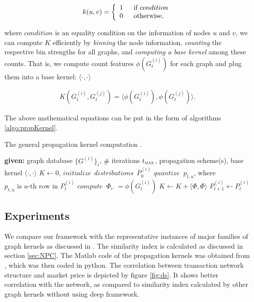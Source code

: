 \documentclass[12pt,a4paper]{article}
\numberwithin{equation}{section}
\numberwithin{figure}{section}
\numberwithin{table}{section}
\begin{document}
\begin{align}
  k(u,v) = \left\{
  \begin{array}{l l}
    1\;\; &  \text{if } condition\\
    0\;\; &  \text{otherwise},
  \end{array} \right.
  \label{equ:dirac_kernel}
\end{align}

where $condition$ is an equality condition on the information of nodes
$u$ and $v$, we can compute $K$ efficiently by \emph{binning} the node
information, \emph{counting} the respective bin strengths for all
graphs, and \emph{computing a base kernel} among these counts.  That
is, we compute count features $\phi(G^{(i)}_t)$ for each graph and
plug them into a base kernel: $\langle \cdot,\cdot \rangle$

\begin{align}
 K(G^{(i)}_t, G^{(j)}_t) = \langle\phi(G^{(i)}_t),\phi(G^{(j)}_t)\rangle.
 \label{equ:feature_kernel}
\end{align}
 
 The above mathematical equations can be put in the form of algorithms \ref{algo:propKernel}.
 
 \begin{algorithm}[t]
  \caption{The general propagation kernel computation \citep{Neumann2015}.}
  \begin{algorithmic}
    \State \textbf{given:} graph database $\{G^{(i)}\}_i$, $\#$ iterations $t_{\textsc{max}}$, propagation scheme(s), base kernel $\langle \cdot, \cdot \rangle$
    \State $K \gets 0$, $initialize\;\, distributions\;\, P_0^{(i)}$
    \State $quantize\;\;p_{t,u}$, where $p_{t,u} \text{ is } u\text{-th row in }P^{(i)}_t$ 			
    \EndFor
    \State $compute\;\;  \Phi_{i \cdot} = \phi(G^{(i)}_t)$  
    \EndFor
    \State $K \gets K + \langle \Phi, \Phi\rangle $ 	
    \State $P^{(i)}_{t+1} \gets P^{(i)}_{t}$ 				
    \EndFor
    \EndFor
  \end{algorithmic}
  \label{algo:propKernel}
\end{algorithm}

\subsection{Experiments}
We compare our framework with the representative instances of
major families of graph kernels as discussed in \citet{Yanardag2015}. The similarity index is calculated as discussed in section \ref{sec:NPC}. The Matlab code of the propagation kernels was obtained from \citep{Neumann2015}, which was then coded in python. The correlation between transaction network structure and market price is depicted by figure \ref{fig:ds}. It shows better correlation with the network, as compared to similarity index calculated by other graph kernels without using deep framework. 
\end{document}
